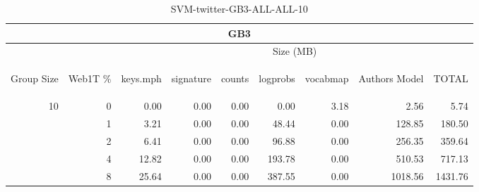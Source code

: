 \begin{center}
\begin{table}[htbp] 
 \begin{center}
\begin{tabular}{ | r | r | r | r | r | r | r | r | r |}
\hline
\multicolumn{9}{|c|}{GB3}\\
\hline
 & & \multicolumn{7}{|c|}{Size (MB)}\\ \cline{3-9}
\begin{sideways}Group Size\end{sideways} & \begin{sideways}Web1T \% \end{sideways} & \begin{sideways}keys.mph\end{sideways} & \begin{sideways}signature\end{sideways} & \begin{sideways}counts\end{sideways} & \begin{sideways}logprobs\end{sideways} & \begin{sideways}vocabmap\end{sideways} & \begin{sideways}Authors Model \end{sideways} & \begin{sideways}TOTAL\end{sideways}\\
\hline
\multirow{4}{*}{10}
 & 0 & 0.00 & 0.00 & 0.00 & 0.00 & 3.18 & 2.56 & 5.74\\ \cline{2-9}
 & 1 & 3.21 & 0.00 & 0.00 & 48.44 & 0.00 & 128.85 & 180.50\\ \cline{2-9}
 & 2 & 6.41 & 0.00 & 0.00 & 96.88 & 0.00 & 256.35 & 359.64\\ \cline{2-9}
 & 4 & 12.82 & 0.00 & 0.00 & 193.78 & 0.00 & 510.53 & 717.13\\ \cline{2-9}
 & 8 & 25.64 & 0.00 & 0.00 & 387.55 & 0.00 & 1018.56 & 1431.76\\ \cline{2-9}
\hline
\end{tabular}
\caption{SVM-twitter-GB3-ALL-ALL-10}
\label{table:SVM-twitter-GB3-ALL-ALL-10}
\end{center}
 \end{table}
\end{center}

